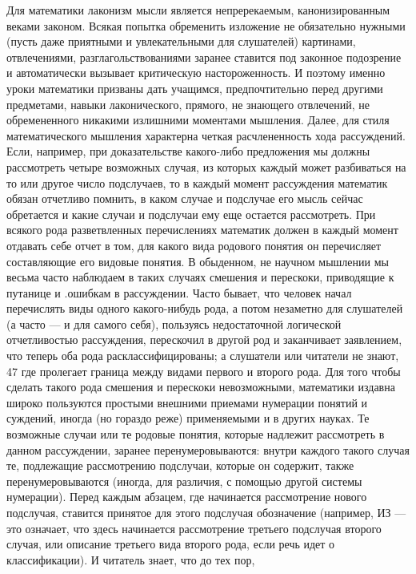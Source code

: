 \documentclass[12pt, a4paper, openany]{book}
\begin{document}
Для математики лаконизм мысли является  
непререкаемым, канонизированным веками законом. Всякая  
попытка обременить изложение не обязательно нужными 
(пусть даже приятными и увлекательными для  
слушателей) картинами, отвлечениями, разглагольствованиями  
заранее ставится под законное подозрение и автоматически 
вызывает критическую настороженность. И поэтому  
именно уроки математики призваны дать учащимся,  
предпочтительно перед другими предметами, навыки лаконического, 
прямого, не знающего отвлечений, не обремененного  
никакими излишними моментами мышления. 
Далее, для стиля математического мышления  
характерна четкая расчлененность хода рассуждений. Если,  
например, при доказательстве какого-либо предложения мы 
должны рассмотреть четыре возможных случая, из  
которых каждый может разбиваться на то или другое число 
подслучаев, то в каждый момент рассуждения математик 
обязан отчетливо помнить, в каком случае и подслучае 
его мысль сейчас обретается и какие случаи и подслучаи 
ему еще остается рассмотреть. При всякого рода  
разветвленных перечислениях математик должен в каждый  
момент отдавать себе отчет в том, для какого вида родового 
понятия он перечисляет составляющие его видовые  
понятия. В обыденном, не научном мышлении мы весьма 
часто наблюдаем в таких случаях смешения и перескоки, 
приводящие к путанице и .ошибкам в рассуждении. Часто 
бывает, что человек начал перечислять виды одного  
какого-нибудь рода, а потом незаметно для слушателей 
(а часто — и для самого себя), пользуясь недостаточной 
логической отчетливостью рассуждения, перескочил в  
другой род и заканчивает заявлением, что теперь оба рода  
расклассифицированы; а слушатели или читатели не знают, 
47 
где пролегает граница между видами первого и второго 
рода. 
Для того чтобы сделать такого рода смешения и  
перескоки невозможными, математики издавна широко  
пользуются простыми внешними приемами нумерации  
понятий и суждений, иногда (но гораздо реже) применяемыми 
и в других науках. Те возможные случаи или те родовые 
понятия, которые надлежит рассмотреть в данном  
рассуждении, заранее перенумеровываются: внутри каждого  
такого случая те, подлежащие рассмотрению подслучаи, 
которые он содержит, также перенумеровываются (иногда, 
для различия, с помощью другой системы нумерации). 
Перед каждым абзацем, где начинается рассмотрение  
нового подслучая, ставится принятое для этого подслучая 
обозначение (например, ИЗ — это означает, что здесь 
начинается рассмотрение третьего подслучая второго  
случая, или описание третьего вида второго рода, если речь 
идет о классификации). И читатель знает, что до тех пор, 
\end{document}
